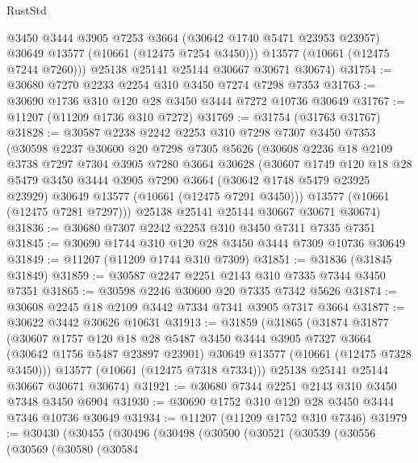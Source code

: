 \begin{lexlean}{RustStd}
\begin{coremodule}
          @3450
          @3444
          @3905
          @7253
          @3664
          (@30642 @1740 @5471 @23953 @23957)
          @30649
          @13577
          (@10661 (@12475 @7254 @3450)))
        @13577
        (@10661 (@12475 @7244 @7260)))
      @25138
      @25141
      @25144
      @30667
      @30671
      @30674)
@31754 := @30680 @7270 @2233 @2254 @310 @3450 @7274 @7298 @7353
@31763 := @30690 @1736 @310 @120 @28 @3450 @3444 @7272 @10736 @30649
@31767 := @11207 (@11209 @1736 @310 @7272)
@31769 := @31754 (@31763 @31767)
@31828 := @30587
    @2238
    @2242
    @2253
    @310
    @7298
    @7307
    @3450
    @7353
    (@30598
      @2237
      @30600
      @20
      @7298
      @7305
      @5626
      (@30608
        @2236
        @18
        @2109
        @3738
        @7297
        @7304
        @3905
        @7280
        @3664
        @30628
        (@30607
          @1749
          @120
          @18
          @28
          @5479
          @3450
          @3444
          @3905
          @7290
          @3664
          (@30642 @1748 @5479 @23925 @23929)
          @30649
          @13577
          (@10661 (@12475 @7291 @3450)))
        @13577
        (@10661 (@12475 @7281 @7297)))
      @25138
      @25141
      @25144
      @30667
      @30671
      @30674)
@31836 := @30680 @7307 @2242 @2253 @310 @3450 @7311 @7335 @7351
@31845 := @30690 @1744 @310 @120 @28 @3450 @3444 @7309 @10736 @30649
@31849 := @11207 (@11209 @1744 @310 @7309)
@31851 := @31836 (@31845 @31849)
@31859 := @30587 @2247 @2251 @2143 @310 @7335 @7344 @3450 @7351
@31865 := @30598 @2246 @30600 @20 @7335 @7342 @5626
@31874 := @30608 @2245 @18 @2109 @3442 @7334 @7341 @3905 @7317 @3664
@31877 := @30622 @3442 @30626 @10631
@31913 := @31859
    (@31865
      (@31874
        @31877
        (@30607
          @1757
          @120
          @18
          @28
          @5487
          @3450
          @3444
          @3905
          @7327
          @3664
          (@30642 @1756 @5487 @23897 @23901)
          @30649
          @13577
          (@10661 (@12475 @7328 @3450)))
        @13577
        (@10661 (@12475 @7318 @7334)))
      @25138
      @25141
      @25144
      @30667
      @30671
      @30674)
@31921 := @30680 @7344 @2251 @2143 @310 @3450 @7348 @3450 @6904
@31930 := @30690 @1752 @310 @120 @28 @3450 @3444 @7346 @10736 @30649
@31934 := @11207 (@11209 @1752 @310 @7346)
@31979 := @30430
    (@30455
      (@30496
        (@30498
          (@30500
            (@30521
              (@30539
                (@30556
                  (@30569
                    (@30580
                      (@30584

\end{coremodule}
\end{lexlean}
